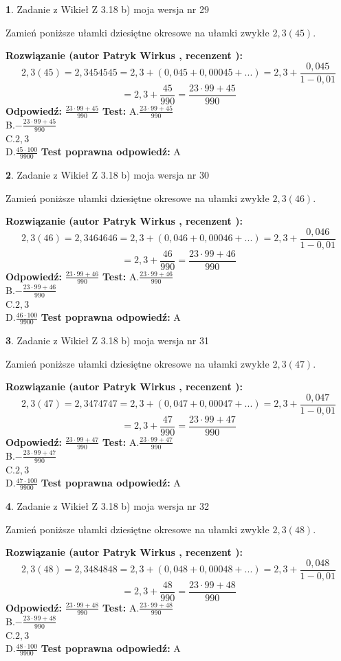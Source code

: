 \documentclass[12pt, a4paper]{article}
\theoremstyle{definition} %
\newtheorem{zad}{}
\newcommand{\zadStart}[1]{\begin{zad}#1\newline}
\newcommand{\zadStop}{\end{zad}}
\newcommand{\rozwStart}[2]{\noindent \textbf{Rozwiązanie (autor #1 , recenzent #2): }\newline}
\newcommand{\rozwStop}{\newline}
\newcommand{\odpStart}{\noindent \textbf{Odpowiedź:}\newline}
\newcommand{\odpStop}{\newline}
\newcommand{\testStart}{\noindent \textbf{Test:}\newline}
\newcommand{\testStop}{\newline}
\newcommand{\kluczStart}{\noindent \textbf{Test poprawna odpowiedź:}\newline}
\newcommand{\kluczStop}{\newline}
\begin{document}
\zadStart{Zadanie z Wikieł Z 3.18 b) moja wersja nr 29}

Zamień poniższe ułamki dziesiętne okresowe na ułamki zwykłe $2,3(45)$.
\zadStop
\rozwStart{Patryk Wirkus}{}
$$2,3(45)=2,3454545=2,3+(0,045+0,00045+...)=2,3+\frac{0,045}{1-0,01}$$
$$=2,3+\frac{45}{990}=\frac{23\cdot99+45}{990}$$
\rozwStop
\odpStart
$\frac{23\cdot99+45}{990}$
\odpStop
\testStart
A.$\frac{23\cdot99+45}{990}$\\ B.$-\frac{23\cdot99+45}{990}$\\ C.$2,3$\\ D.$\frac{45\cdot100}{9900}$
\testStop
\kluczStart
A
\kluczStop



\zadStart{Zadanie z Wikieł Z 3.18 b) moja wersja nr 30}

Zamień poniższe ułamki dziesiętne okresowe na ułamki zwykłe $2,3(46)$.
\zadStop
\rozwStart{Patryk Wirkus}{}
$$2,3(46)=2,3464646=2,3+(0,046+0,00046+...)=2,3+\frac{0,046}{1-0,01}$$
$$=2,3+\frac{46}{990}=\frac{23\cdot99+46}{990}$$
\rozwStop
\odpStart
$\frac{23\cdot99+46}{990}$
\odpStop
\testStart
A.$\frac{23\cdot99+46}{990}$\\ B.$-\frac{23\cdot99+46}{990}$\\ C.$2,3$\\ D.$\frac{46\cdot100}{9900}$
\testStop
\kluczStart
A
\kluczStop



\zadStart{Zadanie z Wikieł Z 3.18 b) moja wersja nr 31}

Zamień poniższe ułamki dziesiętne okresowe na ułamki zwykłe $2,3(47)$.
\zadStop
\rozwStart{Patryk Wirkus}{}
$$2,3(47)=2,3474747=2,3+(0,047+0,00047+...)=2,3+\frac{0,047}{1-0,01}$$
$$=2,3+\frac{47}{990}=\frac{23\cdot99+47}{990}$$
\rozwStop
\odpStart
$\frac{23\cdot99+47}{990}$
\odpStop
\testStart
A.$\frac{23\cdot99+47}{990}$\\ B.$-\frac{23\cdot99+47}{990}$\\ C.$2,3$\\ D.$\frac{47\cdot100}{9900}$
\testStop
\kluczStart
A
\kluczStop



\zadStart{Zadanie z Wikieł Z 3.18 b) moja wersja nr 32}

Zamień poniższe ułamki dziesiętne okresowe na ułamki zwykłe $2,3(48)$.
\zadStop
\rozwStart{Patryk Wirkus}{}
$$2,3(48)=2,3484848=2,3+(0,048+0,00048+...)=2,3+\frac{0,048}{1-0,01}$$
$$=2,3+\frac{48}{990}=\frac{23\cdot99+48}{990}$$
\rozwStop
\odpStart
$\frac{23\cdot99+48}{990}$
\odpStop
\testStart
A.$\frac{23\cdot99+48}{990}$\\ B.$-\frac{23\cdot99+48}{990}$\\ C.$2,3$\\ D.$\frac{48\cdot100}{9900}$
\testStop
\kluczStart
A
\kluczStop
\end{document}
